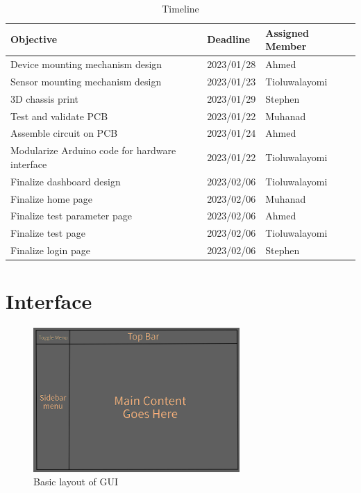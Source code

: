 \documentclass[12pt, titlepage]{article}
\begin{document}
\begin{table}[!h]
  \begin{tabular}{| p{} | p{}| p{}|}
    \hline
    \rowcolor[gray]{0.9}
    Objective & Deadline & Assigned Member\\
    \hline
    Device mounting mechanism design & 2023/01/28 & Ahmed\\
    \hline
    Sensor mounting mechanism design &  2023/01/23 & Tioluwalayomi\\
    \hline
    3D chassis print & 2023/01/29 & Stephen \\
    \hline
    Test and validate PCB & 2023/01/22 & Muhanad \\
    \hline
    Assemble circuit on PCB & 2023/01/24 & Ahmed \\
    \hline
    Modularize Arduino code for hardware interface & 2023/01/22 & Tioluwalayomi \\
    \hline
    Finalize dashboard design & 2023/02/06 & Tioluwalayomi \\
    \hline
    Finalize home page & 2023/02/06 & Muhanad \\
    \hline
    Finalize test parameter page & 2023/02/06 & Ahmed\\
    \hline
    Finalize test page & 2023/02/06 & Tioluwalayomi\\
    \hline
    Finalize login page & 2023/02/06 & Stephen\\
    \hline
   
  \end{tabular}
  \caption{Timeline}
\end{table}


% 

\newpage{}

\appendix

\section{Interface}
\begin{figure}[h!]
  \begin{center}
  \includegraphics[width=0.7\textwidth]{GUI_sketch}
  \caption{Basic layout of GUI}
  \label{Fig_SystemContext} 
  \end{center}
  \end{figure}
\end{document}
